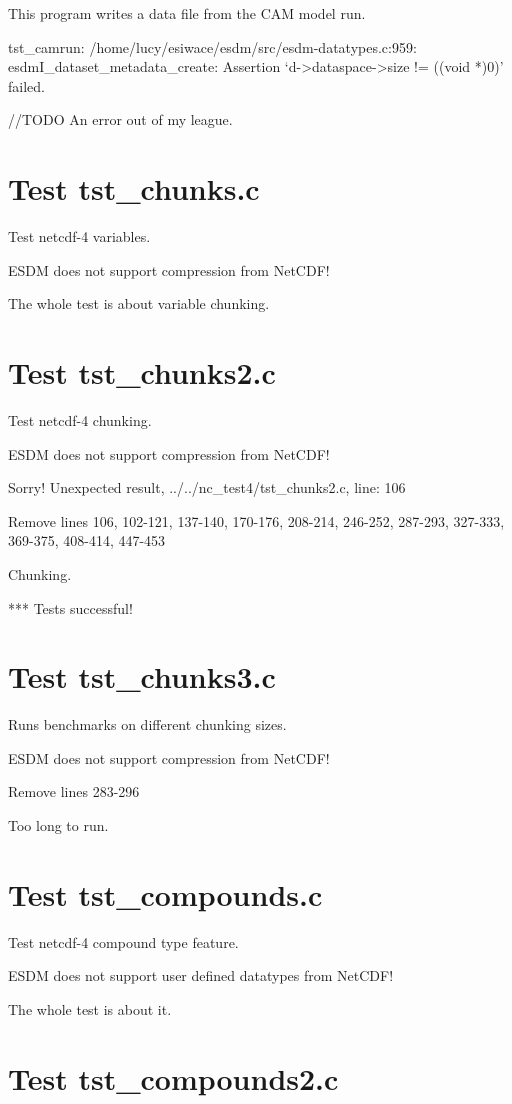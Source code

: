 This program writes a data file from the CAM model run.

tst\_camrun: /home/lucy/esiwace/esdm/src/esdm-datatypes.c:959: esdmI\_dataset\_metadata\_create: Assertion `d->dataspace->size != ((void *)0)' failed.

//TODO An error out of my league.

\section{Test tst\_chunks.c}

Test netcdf-4 variables.

ESDM does not support compression from NetCDF!

The whole test is about variable chunking.

\section{Test tst\_chunks2.c}

Test netcdf-4 chunking.

ESDM does not support compression from NetCDF!

Sorry! Unexpected result, ../../nc\_test4/tst\_chunks2.c, line: 106

Remove lines 106, 102-121, 137-140, 170-176, 208-214, 246-252, 287-293, 327-333, 369-375, 408-414, 447-453

Chunking.

*** Tests successful!

\section{Test tst\_chunks3.c}

Runs benchmarks on different chunking sizes.

ESDM does not support compression from NetCDF!

Remove lines 283-296

Too long to run.

\section{Test tst\_compounds.c}

Test netcdf-4 compound type feature.

ESDM does not support user defined datatypes from NetCDF!

The whole test is about it.

\section{Test tst\_compounds2.c}

